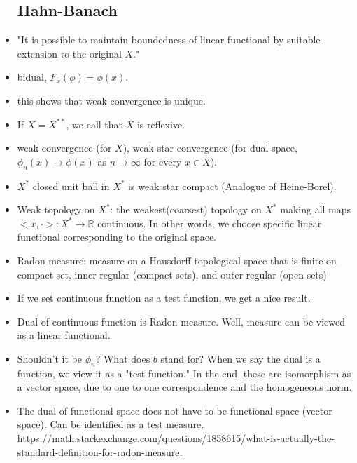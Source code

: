 \documentclass{article}
\theoremstyle{remark}
\begin{document}
\begin{itemize}
\subsection*{Hahn-Banach}
\item "It is possible to maintain boundedness of linear functional by suitable extension to the original $X$."
\item bidual, $F_x (\phi)=\phi(x)$.
\item this shows that weak convergence is unique.
\item If $X=X^{**}$, we call that $X$ is reflexive.
\item weak convergence (for $X$), weak star convergence (for dual space, $\phi_n (x)\to\phi(x)$ as $n\to\infty$ for every $x\in X$).
\item $X^*$ closed unit ball in $X^*$ is weak star compact (Analogue of Heine-Borel).
\item Weak topology on $X^*$: the weakest(coarsest) topology on $X^*$ making all maps $<x,\cdot>:X^*\to \mathbb{R}$ continuous. In other words, we choose specific linear functional corresponding to the original space.
\item Radon measure: measure on a Hausdorff topological space that is finite on compact set, inner regular (compact sets), and outer regular (open sets)
\item If we set continuous function as a test function, we get a nice result. 
\item Dual of continuous function is Radon measure. Well, measure can be viewed as a linear functional. 
\item Shouldn't it be $\phi_n$? What does $b$ stand for? When we say the dual is a function, we view it as a "test function." In the end, these are isomorphism as a vector space, due to one to one correspondence and the homogeneous norm. 
\item The dual of functional space does not have to be functional space (vector space). Can be identified as a test measure. 
\url{https://math.stackexchange.com/questions/1858615/what-is-actually-the-standard-definition-for-radon-measure}.

\end{itemize}
\end{document}
